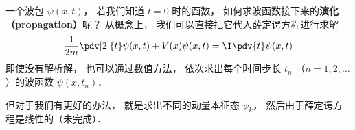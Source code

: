 
\begin{issues}
\issueDraft
\end{issues}

一个波包 $\psi(x, t)$， 若我们知道 $t = 0$ 时的函数， 如何求波函数接下来的\textbf{演化（propagation）}呢？ 从概念上， 我们可以直接把它代入薛定谔方程进行求解
\begin{equation}
\frac{1}{2m}\pdv[2]{t}\psi(x, t) + V(x) \psi(x, t) = \I \pdv{t} \psi(x, t)
\end{equation}
即使没有解析解， 也可以通过数值方法， 依次求出每个时间步长 $t_n$ （$n = 1, 2, \dots$）的波函数 $\psi(x, t_n)$． %

但对于我们有更好的办法， 就是求出不同的动量本征态 $\psi_k$， 然后由于薛定谔方程是线性的（未完成）．

